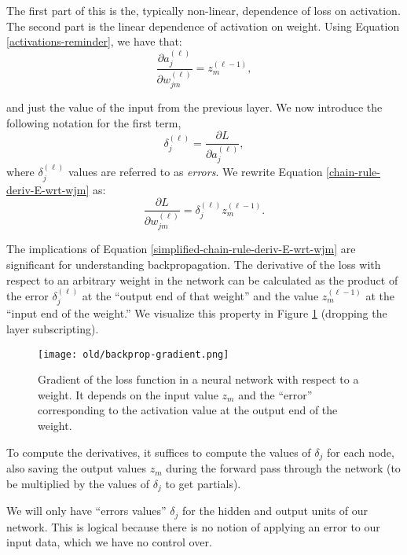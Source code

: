       The first part of this is the, typically non-linear, dependence of loss on activation. The second part is the linear dependence of activation on weight.
Using Equation \ref{activations-reminder}, we have that:
\begin{equation*}
	\frac{\partial a^{(\ell)}_{j}}{\partial w^{(\ell)}_{jm}} = z^{(\ell-1)}_{m},
\end{equation*}

and just the value of the input from the previous layer. We now introduce the following notation for the first term,
%
\begin{equation} \label{delta-expression}
	\delta^{(\ell)}_{j} = \frac{\partial L}{\partial a^{(\ell)}_{j}},
\end{equation}
where $\delta^{(\ell)}_{j}$ values are referred to as \textit{errors}. We rewrite Equation \ref{chain-rule-deriv-E-wrt-wjm} as:
%
\begin{equation} \label{simplified-chain-rule-deriv-E-wrt-wjm}
	\frac{\partial L}{\partial w^{(\ell)}_{jm}} = \delta^{(\ell)}_{j} z^{(\ell-1)}_{m}.
\end{equation}

The implications of Equation \ref{simplified-chain-rule-deriv-E-wrt-wjm} are significant for understanding backpropagation.  The derivative of the loss with respect to an arbitrary weight in the network
can be calculated as the product of the error $\delta^{(\ell)}_j$ at the ``output end of that weight'' and the value $z^{(\ell-1)}_m$ at the ``input end of the weight.''  We visualize this property in Figure \ref{fig:backprop-gradient} (dropping the layer subscripting).
%
\begin{figure}
    \centering
    \texttt{[image: old/backprop-gradient.png]}
    \caption{Gradient of the loss function in a neural network with respect to a weight. It depends on the input value $z_m$ and the ``error'' corresponding to the activation value at the output end of the weight.}
    \label{fig:backprop-gradient}
\end{figure}

To compute the derivatives, it suffices to compute the values of $\delta_{j}$ for each node, also saving the output values  $z_{m}$ during the forward pass through the network (to be multiplied by the values of $\delta_{j}$ to get partials).

\begin{warning}
    We will only have ``errors values'' $\delta_{j}$ for the hidden and output units of our network. This is logical because there is no notion of applying an error to our input data, which we have no control over.
\end{warning}

